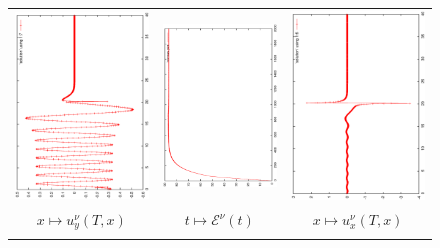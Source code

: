 \begin{figure}[h]
\begin{center}
\begin{tabular}{ccc}
			\includegraphics[angle=-90,width=5.cm]{pics_semilagrange/uy_moit.eps}
			&
			\includegraphics[angle=-90,width=5.cm]{pics_semilagrange/normes_moit.eps}
			&
			\includegraphics[angle=-90,width=5.cm]{pics_semilagrange/ux_moit.eps}
			\\      
			$x\mapsto u_y^\nu(T,x)$ & $t\mapsto \mathcal{E}^{\nu}(t)$ & $x\mapsto u_x^\nu(T,x)$  \\
			
			\\
			

\end{tabular}
\end{center}
\end{figure}
